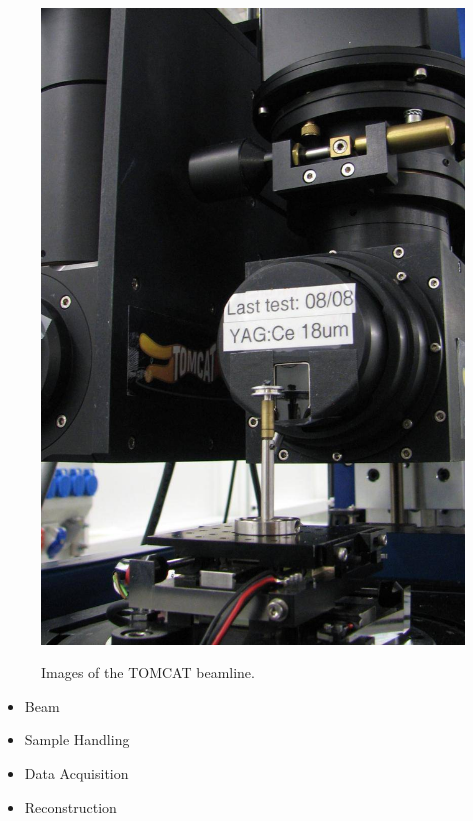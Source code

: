 \begin{figure}[htb]
{		\includegraphics[width=\imsize]{img/TOMCAT2}%
		\label{subfig:TOMCAT2}%
		}%
	\caption{Images of the \ac{TOMCAT} beamline.}
\end{figure}

\begin{itemize}
	\item Beam
    \item Sample Handling
    \item Data Acquisition
    \item Reconstruction
\end{itemize}